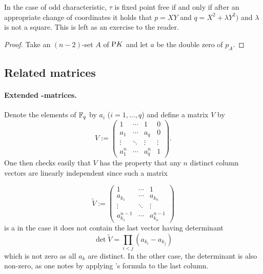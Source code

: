 \begin{remark}
    In the case of odd characteristic, $\tau$ is fixed point free if and only if after an appropriate change of coordinates it holds that $p=XY$ and $q=X^2+\lambda Y^2)$ and $\lambda$ is not a square. This is left as an exercise to the reader. 
\end{remark}

\begin{lemma}[bla]

\end{lemma}

\begin{proof}
    Take an $(n-2)$-set $A$ of $\mathrm{P}{K}$ and let $a$ be the double zero of $p_A$. 
\end{proof}

\subsection{Related matrices}

\paragraph{Extended -matrices.}
Denote the elements of $\mathbb{F}_{q}$ by $a_i$ ($i=1,\ldots,q$) and define a matrix $V$ by
$$
V :=
\begin{pmatrix}
    1      & \cdots & 1      & 0      \\
    a_1    & \cdots & a_q    & 0      \\
    \vdots & \ddots & \vdots & \vdots \\
    a_1^n  & \cdots & a_q^n  & 1
\end{pmatrix}\textrm{.}
$$
One then checks easily that $V$ has the property that any $n$ distinct column vectors are linearly independent since such a matrix

$$
\tilde V :=
\begin{pmatrix}
    1             & \cdots & 1       \\
    a_{k_1}       & \cdots & a_{k_n} \\
    \vdots        & \ddots & \vdots  \\
    a_{k_1}^{n-1} & \cdots & a_{k_n}^{n-1} 
\end{pmatrix}
$$
is a  in the case it does not contain the last vector having determinant
$$
    \det{\tilde V} = \prod_{i<j}{(a_{k_i}-a_{k_j})}
$$
which is not zero as all $a_k$ are distinct. In the other case, the determinant is also non-zero, as one notes by applying 's formula to the last column.

